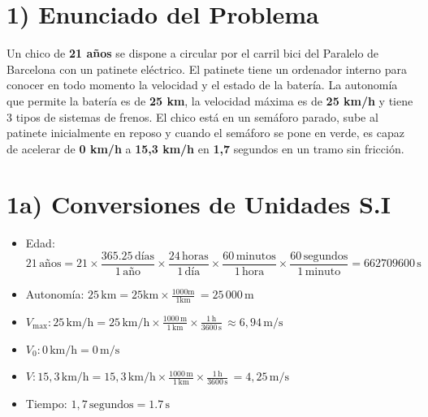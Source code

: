 \documentclass{article}
\begin{document}
\section*{1) Enunciado del Problema}

Un chico de \textbf{21 años}  se dispone a circular por el carril bici del Paralelo de Barcelona con un patinete eléctrico. El patinete tiene un ordenador interno para conocer en todo momento la velocidad y el estado de la batería. La autonomía que permite la batería es de \textbf{25 km}, la velocidad máxima es de \textbf{25 km/h} y tiene 3 tipos de sistemas de frenos. El chico está en un semáforo parado, sube al patinete inicialmente en reposo y cuando el semáforo se pone en verde, es capaz de acelerar de \textbf{0 km/h} a \textbf{15,3 km/h} en \textbf{1,7} segundos en un tramo sin fricción.


\section*{1a) Conversiones de Unidades S.I}

\begin{itemize}
    \item Edad: \[
21 \, \text{años} = 21 \times \frac{365.25 \, \text{días}}{1 \, \text{año}} \times \frac{24 \, \text{horas}}{1 \, \text{día}} \times \frac{60 \, \text{minutos}}{1 \, \text{hora}} \times \frac{60 \, \text{segundos}}{1 \, \text{minuto}} = \boxed{662709600\, \text{s}}
\]
    \item Autonomía: \(25 \, \text{km} = 25 \text{km}\times \frac{1000 \text{m}}{1 \text{km}}{} \, = \boxed{25\,000 \, \text{m}}\)
    \item \(V_{\text{max}}: 25 \, \text{km/h} = 25\, \text{km/h} \times \frac{1000\,\text{m}}{1\,\text{km}} \times \frac{1\,\text{h}}{3600\,\text{s}} \, \approx \boxed{6,94 \, \text{m/s}} \)
    \item \(V_0: 0 \, \text{km/h} = \boxed{0 \, \text{m/s}}\)
    \item \(V: 15,3 \, \text{km/h} = 15,3\, \text{km/h} \times \frac{1000\,\text{m}}{1\,\text{km}} \times \frac{1\,\text{h}}{3600\,\text{s}} \, = \boxed{4,25 \, \text{m/s}} \)
    \item Tiempo: \(1,7 \, \text{segundos} = \boxed{1.7 \, \text{s}}\)
\end{itemize}

\end{document}
